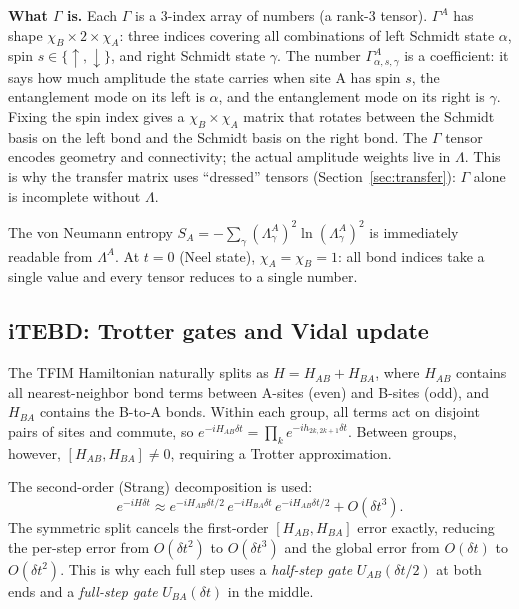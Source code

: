 \documentclass[11pt,a4paper]{article}
\begin{document}
\textbf{What $\Gamma$ is.} Each $\Gamma$ is a 3-index array of numbers (a rank-3
tensor). $\Gamma^A$ has shape $\chi_B \times 2 \times \chi_A$: three indices
covering all combinations of left Schmidt state $\alpha$, spin $s \in
\{\uparrow,\downarrow\}$, and right Schmidt state $\gamma$. The number
$\Gamma^A_{\alpha, s, \gamma}$ is a coefficient: it says how much amplitude
the state carries when site A has spin $s$, the entanglement mode on its left
is $\alpha$, and the entanglement mode on its right is $\gamma$. Fixing the spin
index gives a $\chi_B \times \chi_A$ matrix that rotates between the Schmidt
basis on the left bond and the Schmidt basis on the right bond. The $\Gamma$
tensor encodes geometry and connectivity; the actual amplitude weights live
in $\Lambda$. This is why the transfer matrix uses ``dressed'' tensors
(Section~\ref{sec:transfer}): $\Gamma$ alone is incomplete without $\Lambda$.

The von Neumann entropy $S_A = -\sum_\gamma (\Lambda^A_\gamma)^2
\ln(\Lambda^A_\gamma)^2$ is immediately readable from $\Lambda^A$.
At $t=0$ (Neel state), $\chi_A = \chi_B = 1$: all bond indices take a single
value and every tensor reduces to a single number.

\subsection{iTEBD: Trotter gates and Vidal update}

The TFIM Hamiltonian naturally splits as $H = H_{AB} + H_{BA}$, where $H_{AB}$
contains all nearest-neighbor bond terms between A-sites (even) and B-sites
(odd), and $H_{BA}$ contains the B-to-A bonds. Within each group, all terms
act on disjoint pairs of sites and commute, so $e^{-iH_{AB}\delta t} = \prod_k e^{-ih_{2k,2k+1}\delta t}$.
Between groups, however, $[H_{AB}, H_{BA}] \neq 0$, requiring a Trotter approximation.

The second-order (Strang) decomposition is used:
\begin{equation}
  e^{-iH\delta t} \approx e^{-iH_{AB}\delta t/2}\, e^{-iH_{BA}\delta t}\, e^{-iH_{AB}\delta t/2} + O(\delta t^3).
  \label{eq:trotter}
\end{equation}
The symmetric split cancels the first-order $[H_{AB}, H_{BA}]$ error exactly,
reducing the per-step error from $O(\delta t^2)$ to $O(\delta t^3)$ and the
global error from $O(\delta t)$ to $O(\delta t^2)$. This is why each full step
uses a \emph{half-step gate} $U_{AB}(\delta t/2)$ at both ends and a
\emph{full-step gate} $U_{BA}(\delta t)$ in the middle.
\end{document}
